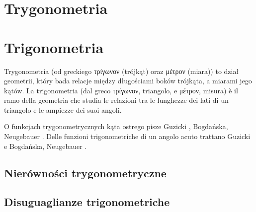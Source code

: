 
%

\chapter{Trygonometria} %
\chapter{Trigonometria} %


Trygonometria (od greckiego τρίγωνον (trójkąt) oraz μέτρον (miara)) to dział geometrii, który bada relacje między długościami boków trójkąta, a miarami jego kątów. %
La trigonometria (dal greco τρίγωνον, triangolo, e μέτρον, misura) è il ramo della geometria che studia le relazioni tra le lunghezze dei lati di un triangolo e le ampiezze dei suoi angoli. %

O funkcjach trygonometrycznych kąta ostrego pisze Guzicki \cite[s. 240-254]{guzicki_2021}, Bogdańska, Neugebauer \cite[s. 88]{neugebauer_2018}. %
Delle funzioni trigonometriche di un angolo acuto trattano Guzicki \cite[pp.~240--254]{guzicki_2021} e Bogdańska, Neugebauer \cite[p.~88]{neugebauer_2018}. %











\section{Nierówności trygonometryczne} %
\section{Disuguaglianze trigonometriche} %

